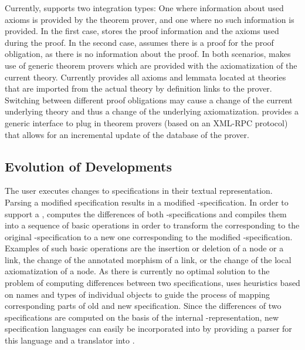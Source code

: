 Currently, {\maya} supports two integration types: One where
information about used axioms is provided by the theorem prover, and
one where no such information is provided. In the first case, {\maya}
stores the proof information and the axioms used during the proof. In the second
case, {\maya} assumes there is a proof for the proof obligation, as there is no
information about the proof. In both scenarios, {\maya} makes use of
generic theorem provers which are provided with the axiomatization of
the current theory. Currently {\maya} provides all axioms
and lemmata located at theories that are imported from the actual theory
by definition links to the prover. Switching between different proof obligations may
cause a change of the current underlying theory and thus a change of
the underlying axiomatization.  {\maya} provides a generic interface to
plug in theorem provers (based on an XML-RPC protocol) that allows for
an incremental update of the database of the prover.


\subsection{Evolution of Developments}

The user executes changes to specifications in their textual representation.  Parsing a
modified specification results in a modified {\dgrl}-specification. In order to support a
{}, {\maya} computes the differences of both
{\dgrl}-specifications and compiles them into a sequence of basic operations in order to
transform the {} corresponding to the original
{\dgrl}-specification to a new one corresponding to the modified
{\dgrl}-specification. Examples of such basic operations are the insertion or deletion of
a node or a link, the change of the annotated morphism of a link, or the change of the
local axiomatization of a node. As there is currently no optimal solution to the problem
of computing differences between two specifications, {\maya} uses heuristics based on
names and types of individual objects to guide the process of mapping corresponding parts
of old and new specification. Since the differences of two specifications are computed on
the basis of the internal {\dgrl}-representation, new specification languages can easily
be incorporated into {\maya} by providing a parser for this language and a translator into
{\dgrl}.

